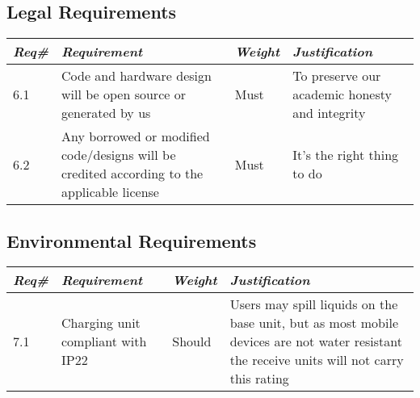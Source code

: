     \subsection{Legal Requirements}
        \begin{centering}
        \begin{tabular}{|l|m{7cm}|l|m{7cm}|} \hline
        \textit{\textbf{Req\#}}	& \textit{\textbf{Requirement}} &\textit{\textbf{Weight}}&\textit{\textbf{Justification}} \\ \hline
        6.1	& Code and hardware design will be open source or generated by us& Must	&To preserve our academic honesty and integrity \\ \hline
        6.2	& Any borrowed or modified code/designs will be credited according to the applicable license & Must	&It's the right thing to do\\ \hline
        \end{tabular}
        \end{centering}
    
    
    \subsection{Environmental Requirements}
        \begin{centering}
        \begin{tabular}{|l|m{7cm}|l|m{7cm}|} \hline
        \textit{\textbf{Req\#}}	& \textit{\textbf{Requirement}} &\textit{\textbf{Weight}}&\textit{\textbf{Justification}} \\ \hline
        7.1	& Charging unit compliant with IP22	\cite{iprating} & Should & Users may spill liquids on the base unit, but as most mobile devices are not water resistant the receive units will not carry this rating \\ \hline
        \end{tabular}
        \end{centering}
    
    
